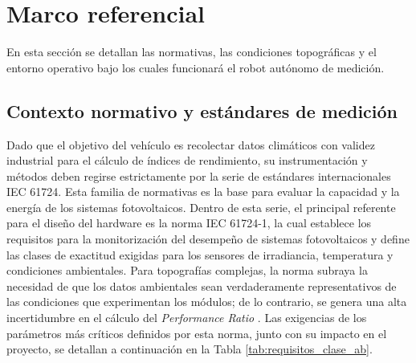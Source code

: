 \documentclass[../../General.tex]{subfiles}
\begin{document}
\section{Marco referencial}

En esta sección se detallan las normativas, las condiciones topográficas y el entorno operativo bajo los cuales funcionará el robot autónomo de medición.


\subsection{Contexto normativo y estándares de medición} 
Dado que el objetivo del vehículo es recolectar datos climáticos con validez industrial para el cálculo de índices de rendimiento, su instrumentación y métodos deben regirse estrictamente por la serie de estándares internacionales IEC 61724. Esta familia de normativas es la base para evaluar la capacidad y la energía de los sistemas fotovoltaicos. Dentro de esta serie, el principal referente para el diseño del hardware es la norma IEC 61724-1, la cual establece los requisitos para la monitorización del desempeño de sistemas fotovoltaicos y define las clases de exactitud exigidas para los sensores de irradiancia, temperatura y condiciones ambientales. Para topografías complejas, la norma subraya la necesidad de que los datos ambientales sean verdaderamente representativos de las condiciones que experimentan los módulos; de lo contrario, se genera una alta incertidumbre en el cálculo del \textit{Performance Ratio} \citep{IEC61724-1_2021}. Las exigencias de los parámetros más críticos definidos por esta norma, junto con su impacto en el proyecto, se detallan a continuación en la Tabla \ref{tab:requisitos_clase_ab}.
\end{document}
